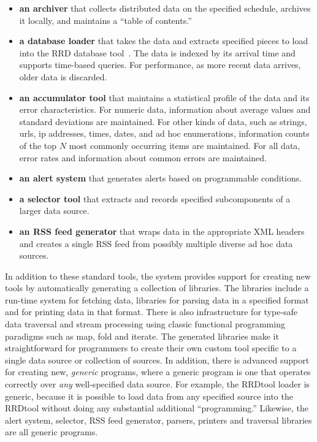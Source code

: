 \documentclass[nocopyrightspace]{sigplanconf}
\begin{document}
\begin{itemize}
\item {\bf an archiver} that
collects distributed data on the specified schedule, archives it locally, and maintains a 
``table of contents.''
\item {\bf a database loader} that takes the data and extracts specified pieces to load into the
RRD database tool~\cite{rrdtool}.  The data is indexed by its arrival time and supports time-based
queries.  For performance, as more recent data arrives, older data is discarded.
\item {\bf an accumulator tool} that maintains a statistical profile of the data and its error characteristics.
For numeric data, information about average values and standard deviations are maintained.
For other kinds of data, such as strings, urls, ip addresses, times, dates, and ad hoc enumerations,
information counts of the top $N$ most commonly occurring items are maintained.  For all data, error rates
and information about common errors are maintained.
\item {\bf an alert system} that generates alerts based on programmable conditions.
\item {\bf a selector tool} that extracts and records specified subcomponents of a larger data source.
\item {\bf an RSS feed generator} that wraps data in the appropriate XML headers and creates a single RSS feed
from possibly multiple diverse ad hoc data sources.
\end{itemize}

In addition to these standard tools, the system provides support for
creating new tools by automatically generating a collection of
libraries.  The libraries include a run-time system for fetching data,
libraries for parsing data in a specified format and for printing data
in that format.  There is also infrastructure for type-safe data
traversal and stream processing using classic functional programming
paradigms such as map, fold and iterate.  The generated libraries make
it straightforward for programmers to create their own custom tool
specific to a single data source or collection of sources.  In
addition, there is advanced support for creating new, {\em generic}
programs, where a generic program is one that operates correctly over
{\em any} well-specified data source.  For example, the RRDtool loader
is generic, because it is possible to load data from any specified
source into the RRDtool without doing any substantial additional ``programming.''
Likewise, the alert system, selector, RSS feed generator, parsers,
printers and traversal libraries are all generic programs.
\end{document}
